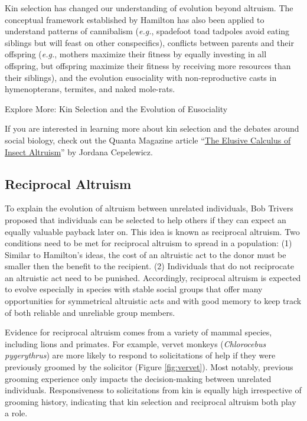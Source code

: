 \documentclass[
]{book}
\begin{document}
Kin selection has changed our understanding of evolution beyond altruism. The conceptual framework established by Hamilton has also been applied to understand patterns of cannibalism (\emph{e.g.}, spadefoot toad tadpoles avoid eating siblings but will feast on other conspecifics), conflicts between parents and their offspring (\emph{e.g.}, mothers maximize their fitness by equally investing in all offspring, but offspring maximize their fitness by receiving more resources than their siblings), and the evolution eusociality with non-reproductive casts in hymenopterans, termites, and naked mole-rats.

Explore More: Kin Selection and the Evolution of Eusociality

If you are interested in learning more about kin selection and the debates around social biology, check out the Quanta Magazine article ``\href{https://www.scientificamerican.com/article/the-elusive-calculus-of-insect-altruism/}{The Elusive Calculus of Insect Altruism}'' by Jordana Cepelewicz.

\hypertarget{reciprocal-altruism}{%
\subsection{Reciprocal Altruism}\label{reciprocal-altruism}}

To explain the evolution of altruism between unrelated individuals, Bob Trivers proposed that individuals can be selected to help others if they can expect an equally valuable payback later on. This idea is known as reciprocal altruism. Two conditions need to be met for reciprocal altruism to spread in a population: (1) Similar to Hamilton's ideas, the cost of an altruistic act to the donor must be smaller then the benefit to the recipient. (2) Individuals that do not reciprocate an altruistic act need to be punished. Accordingly, reciprocal altruism is expected to evolve especially in species with stable social groups that offer many opportunities for symmetrical altruistic acts and with good memory to keep track of both reliable and unreliable group members.

Evidence for reciprocal altruism comes from a variety of mammal species, including lions and primates. For example, vervet monkeys (\emph{Chlorocebus pygerythrus}) are more likely to respond to solicitations of help if they were previously groomed by the solicitor (Figure \ref{fig:vervet}). Most notably, previous grooming experience only impacts the decision-making between unrelated individuals. Responsiveness to solicitations from kin is equally high irrespective of grooming history, indicating that kin selection and reciprocal altruism both play a role.
\end{document}
